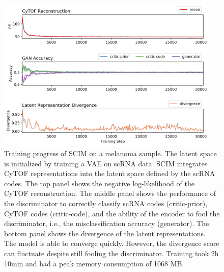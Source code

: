 \begin{figure}[htbp]
    \centering
    \includegraphics[width=0.95\textwidth]{figures/integration/menytek-train-scores}
    \caption{
        Training progress of SCIM on a melanoma sample.
        The latent space is initialized by training a VAE on scRNA data.
        SCIM integrates CyTOF representations into the latent space
        defined by the scRNA codes.
        The top panel shows the negative log-likelihood of the CyTOF reconstruction.
        The middle panel shows the performance of the discriminator to correctly classify scRNA codes (critic-prior), CyTOF codes (critic-code), and the ability of the encoder to fool the discriminator, i.e., the misclassification accuracy (generator).
        The bottom panel shows the divergence of the latent representations.
        The model is able to converge quickly.
However, the divergence score can fluctuate despite still fooling the discriminator.
        Training took 2h 10min and had a peak memory consumption of 1068 MB.
    }
    \label{fig:tupro-train}
\end{figure}


